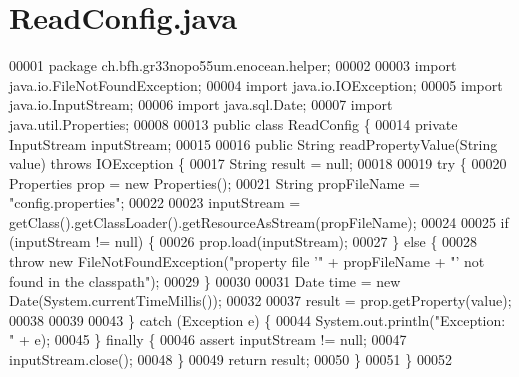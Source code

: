\section{Read\+Config.\+java}
\label{ReadConfig_8java_source}

\begin{DoxyCode}
00001 \textcolor{keyword}{package }ch.bfh.gr33nopo55um.enocean.helper;
00002 
00003 \textcolor{keyword}{import} java.io.FileNotFoundException;
00004 \textcolor{keyword}{import} java.io.IOException;
00005 \textcolor{keyword}{import} java.io.InputStream;
00006 \textcolor{keyword}{import} java.sql.Date;
00007 \textcolor{keyword}{import} java.util.Properties;
00008 
00013 \textcolor{keyword}{public} \textcolor{keyword}{class }ReadConfig \{
00014     \textcolor{keyword}{private} InputStream inputStream;
00015 
00016     \textcolor{keyword}{public} String readPropertyValue(String value) \textcolor{keywordflow}{throws} IOException \{
00017         String result = null;
00018 
00019         \textcolor{keywordflow}{try} \{
00020             Properties prop = \textcolor{keyword}{new} Properties();
00021             String propFileName = \textcolor{stringliteral}{"config.properties"};
00022 
00023             inputStream = getClass().getClassLoader().getResourceAsStream(propFileName);
00024 
00025             \textcolor{keywordflow}{if} (inputStream != null) \{
00026                 prop.load(inputStream);
00027             \} \textcolor{keywordflow}{else} \{
00028                 \textcolor{keywordflow}{throw} \textcolor{keyword}{new} FileNotFoundException(\textcolor{stringliteral}{"property file '"} + propFileName + \textcolor{stringliteral}{"' not found in the
       classpath"});
00029             \}
00030 
00031             Date time = \textcolor{keyword}{new} Date(System.currentTimeMillis());
00032 
00037             result = prop.getProperty(value);
00038 
00039 
00043         \} \textcolor{keywordflow}{catch} (Exception e) \{
00044             System.out.println(\textcolor{stringliteral}{"Exception: "} + e);
00045         \} \textcolor{keywordflow}{finally} \{
00046             assert inputStream != null;
00047             inputStream.close();
00048         \}
00049         \textcolor{keywordflow}{return} result;
00050     \}
00051 \}
00052 
\end{DoxyCode}

